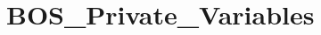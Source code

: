 \hypertarget{group___b_o_s___private___variables}{}\section{B\+O\+S\+\_\+\+Private\+\_\+\+Variables}
\label{group___b_o_s___private___variables}
